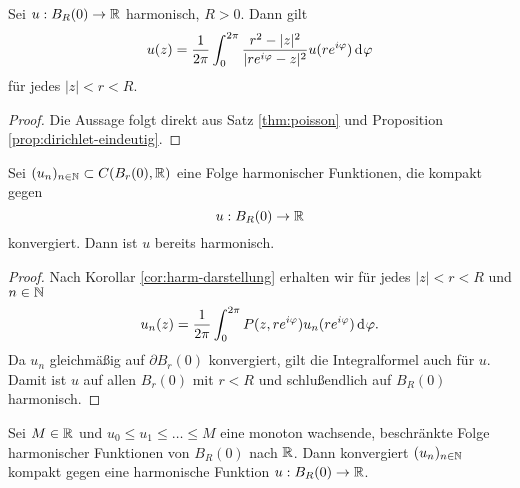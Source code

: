 \begin{cor}
  \label{cor:harm-darstellung}
  Sei $u: B_R(0) \rightarrow \mathbb{R}$ harmonisch, $ R > 0$. Dann gilt
  \[
  u(z) = \frac{1}{2\pi} \int_0^{2\pi} \frac{r^2 - |z|^2}{|re^{i\phi} -
    z|^2} u(re^{i\phi}) \d[\phi]
  \]
  für jedes $|z|<r<R$.
\end{cor}

\begin{proof}
  Die Aussage folgt direkt aus Satz \ref{thm:poisson} und Proposition \ref{prop:dirichlet-eindeutig}.
\end{proof}

\begin{cor}
  \label{cor:harm-konvergenz}
  Sei $(u_n)_{n\in \mathbb{N}} \subset C(B_r(0), \mathbb{R})$ eine Folge harmonischer
  Funktionen, die kompakt gegen
  \[
  u: B_R(0) \rightarrow \mathbb{R}
  \]
  konvergiert. Dann ist $u$ bereits harmonisch.
\end{cor}

\begin{proof}
  Nach Korollar \ref{cor:harm-darstellung} erhalten wir für jedes $|z|
  < r <R$ und $n \in \mathbb{N}$
  \[
  u_n(z) = \frac{1}{2\pi} \int_0^{2\pi} P(z, re^{i\phi})
  u_n(re^{i\phi}) \d[\phi].
  \]
  Da $u_n$ gleichmäßig auf $\partial B_r(0)$ konvergiert, gilt die
  Integralformel auch für $u$. Damit ist $u$ auf allen $B_r(0)$ mit $r <
  R$ und schlußendlich auf $B_R(0)$ harmonisch.
\end{proof}

\begin{thm}
  \label{thm:harnack}
  Sei $M \in \mathbb{R}$ und $u_0 \leq u_1 \leq \dots \leq M$ eine monoton
  wachsende, beschränkte Folge harmonischer Funktionen von $B_R(0)$ nach
  $\mathbb{R}$. Dann konvergiert $(u_n)_{n\in \mathbb{N}}$ kompakt gegen eine harmonische
  Funktion $u: B_R(0) \rightarrow \mathbb{R}$.
\end{thm}

